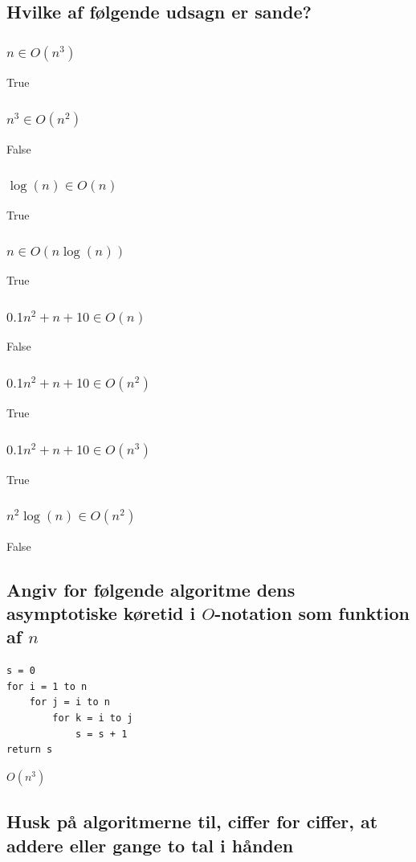 \documentclass[12pt, a4paper]{article}
\begin{document}
		\subsection{Hvilke af følgende udsagn er sande?}
			\subsubsection{$n\in O(n^3)$}
				True
			\subsubsection{$n^3\in O(n^2)$}
				False
			\subsubsection{$\log(n)\in O(n)$}
				True
			\subsubsection{$n\in O(n\log(n))$}
				True
			\subsubsection{$0.1n^2+n+10\in O(n)$}
				False
			\subsubsection{$0.1n^2+n+10\in O(n^2)$}
				True
			\subsubsection{$0.1n^2+n+10\in O(n^3)$}
				True
			\subsubsection{$n^2\log(n)\in O(n^2)$}
				False
		\subsection{Angiv for følgende algoritme dens asymptotiske køretid i $O$-notation som funktion af $n$}
			\begin{lstlisting}
s = 0
for i = 1 to n
	for j = i to n
		for k = i to j
			s = s + 1
return s
			\end{lstlisting}
			$O(n^3)$
		\subsection{Husk på algoritmerne til, ciffer for ciffer, at addere eller gange to tal i hånden}
\end{document}
